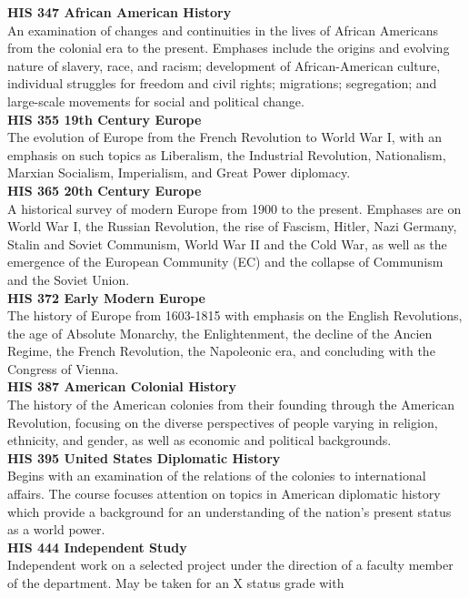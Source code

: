 \documentclass[
  letterpaper,
]{scrbook}
\begin{document}
\textbf{HIS 347 African American History}\\
An examination of changes and continuities in the lives of African
Americans from the colonial era to the present. Emphases include the
origins and evolving nature of slavery, race, and racism; development of
African-American culture, individual struggles for freedom and civil
rights; migrations; segregation; and large-scale movements for social
and political change.\\
\textbf{HIS 355 19th Century Europe}\\
The evolution of Europe from the French Revolution to World War I, with
an emphasis on such topics as Liberalism, the Industrial Revolution,
Nationalism, Marxian Socialism, Imperialism, and Great Power
diplomacy.\\
\textbf{HIS 365 20th Century Europe}\\
A historical survey of modern Europe from 1900 to the present. Emphases
are on World War I, the Russian Revolution, the rise of Fascism, Hitler,
Nazi Germany, Stalin and Soviet Communism, World War II and the Cold
War, as well as the emergence of the European Community (EC) and the
collapse of Communism and the Soviet Union.\\
\textbf{HIS 372 Early Modern Europe}\\
The history of Europe from 1603-1815 with emphasis on the English
Revolutions, the age of Absolute Monarchy, the Enlightenment, the
decline of the Ancien Regime, the French Revolution, the Napoleonic era,
and concluding with the Congress of Vienna.\\
\textbf{HIS 387 American Colonial History}\\
The history of the American colonies from their founding through the
American Revolution, focusing on the diverse perspectives of people
varying in religion, ethnicity, and gender, as well as economic and
political backgrounds.\\
\textbf{HIS 395 United States Diplomatic History}\\
Begins with an examination of the relations of the colonies to
international affairs. The course focuses attention on topics in
American diplomatic history which provide a background for an
understanding of the nation's present status as a world power.\\
\textbf{HIS 444 Independent Study}\\
Independent work on a selected project under the direction of a faculty
member of the department. May be taken for an X status grade with
\end{document}
